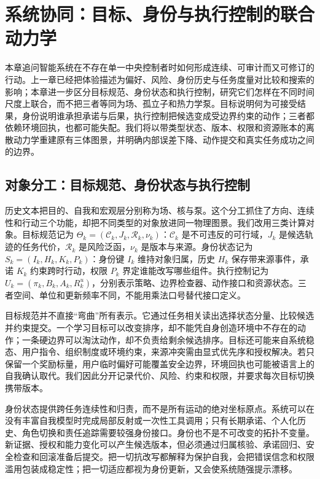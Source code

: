 \chapter{系统协同：目标、身份与执行控制的联合动力学}
\label{chp:system_synergy}
本章追问智能系统在不存在单一中央控制者时如何形成连续、可审计而又可修订的行动。上一章已经把体验描述为偏好、风险、身份历史与任务度量对比较和搜索的影响；本章进一步区分目标规范、身份状态和执行控制，研究它们怎样在不同时间尺度上联合，而不把三者等同为场、孤立子和热力学泵。目标说明何为可接受结果，身份说明谁承担承诺与后果，执行控制把候选变成受边界约束的动作；三者都依赖环境回执，也都可能失配。我们将以带类型状态、版本、权限和资源账本的离散动力学重建原有三体图景，并明确内部误差下降、动作提交和真实任务成功之间的边界。

\section{对象分工：目标规范、身份状态与执行控制}
\label{sec:section_9326}
历史文本把目的、自我和宏观层分别称为场、核与泵。这个分工抓住了方向、连续性和行动三个功能，却把不同类型的对象放进同一物理图景。我们改用三类计算对象。目标规范记为 $\Theta_k=(\mathcal C_k,J_k,\mathcal R_k,\nu_k)$：$\mathcal C_k$ 是不可违反的可行域，$J_k$ 是候选轨迹的任务代价，$\mathcal R_k$ 是风险泛函，$\nu_k$ 是版本与来源。身份状态记为 $S_k=(I_k,H_k,K_k,P_k)$：身份键 $I_k$ 维持对象归属，历史 $H_k$ 保存带来源事件，承诺 $K_k$ 约束跨时行动，权限 $P_k$ 界定谁能改写哪些组件。执行控制记为 $U_k=(\pi_k,B_k,A_k,R^u_k)$，分别表示策略、边界检查器、动作接口和资源状态。三者空间、单位和更新频率不同，不能用乘法口号替代接口定义。

目标规范并不直接“弯曲”所有表示。它通过任务相关读出选择状态分量、比较候选并约束提交。一个学习目标可以改变排序，却不能凭自身创造环境中不存在的动作；一条硬边界可以淘汰动作，却不负责给剩余候选排序。目标还可能来自系统稳态、用户指令、组织制度或环境约束，来源冲突需由显式优先序和授权解决。若只保留一个奖励标量，用户临时偏好可能覆盖安全边界，环境回执也可能被语言上的自我确认取代。我们因此分开记录代价、风险、约束和权限，并要求每次目标切换携带版本。

身份状态提供跨任务连续性和归责，而不是所有运动的绝对坐标原点。系统可以在没有丰富自我模型时完成局部反射或一次性工具调用；只有长期承诺、个人化历史、角色切换和责任追踪需要较强身份接口。身份也不是不可改变的拓扑不变量。新证据、授权和能力变化可以产生候选版本，但必须通过归属核验、承诺回归、安全检查和回滚准备后提交。把一切抗改写都解释为保护自我，会把错误信念和权限滥用包装成稳定性；把一切适应都视为身份更新，又会使系统随强提示漂移。

